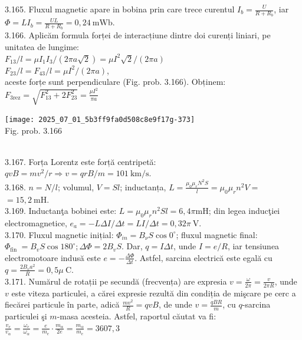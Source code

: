 \begin{center}
3.165. Fluxul magnetic apare in bobina prin care trece curentul $I_{b}=\frac{U}{R+R_{b}}$, iar $\Phi=L I_{b}=\frac{U L}{R+R_{b}}=0,24 \mathrm{~mWb}$.\\

3.166. Aplicăm formula forței de interacțiune dintre doi curenți liniari, pe unitatea de lungime:\\ $F_{13} / l=\mu I_{1} I_{3} /(2 \pi a \sqrt{2})=\mu I^{2} \sqrt{2} /(2 \pi a)$\\$F_{23} / l=F_{43} / l=\mu I^{2} /(2 \pi a)$,\\ aceste forțe sunt perpendiculare (Fig. prob. 3.166). Obținem: $F_{3 \mathrm{rez}}=\sqrt{F_{13}^{2}+2 F_{23}^{2}}=\frac{\mu I^{2}}{\pi a}$\\ \begin{center} \texttt{[image: 2025\_07\_01\_5b3ff9fa0d508c8e9f17g-373]}\\ Fig. prob. 3.166 \end{center}\\

3.167. Forța Lorentz este forță centripetă:\\ $q v B=m v^{2} / r \Rightarrow v=q r B / m=101 \mathrm{~km} / \mathrm{s}$.\\

3.168. $n=N / l$; volumul, $V=S l$; inductanța, $L=\frac{\mu_{0} \mu_{r} N^{2} S}{l}=\mu_{0} \mu_{r} n^{2} V=$ $=15,2 \mathrm{~mH}$.\\

3.169. Inductanţa bobinei este: $L=\mu_{0} \mu_{r} n^{2} S l=6,4 \pi \mathrm{mH}$; din legea inducţiei electromagnetice, $e_{a}=-L \Delta I / \Delta t=L I / \Delta t=0,32 \pi \mathrm{~V}$.\\

3.170. Fluxul magnetic inițial: $\Phi_{i n}=B_{\nu} S \cos 0^{\circ}$; fluxul magnetic final: $\Phi_{\text {fin }}=B_{v} S \cos 180^{\circ} ; \Delta \Phi=2 B_{v} S$. Dar, $q=I \Delta t$, unde $I=e / R$, iar tensiunea electromotoare indusă este $e=-\frac{\Delta \Phi}{\Delta t}$. Astfel, sarcina electrică este egală cu $q=\frac{2 B_{v} a^{2}}{R}=0,5 \mu \mathrm{~C}$.\\

3.171. Numărul de rotații pe secundă (frecvența) are expresia $v=\frac{\omega}{2 \pi}=\frac{v}{2 \pi R}$, unde $v$ este viteza particulei, a cărei expresie rezultă din condiția de mişcare pe cerc a fiecărei particule în parte, adică $\frac{m v^{2}}{R}=q v B$, de unde $v=\frac{q B R}{m}$, cu $q$-sarcina particulei şi $m$-masa acesteia. Astfel, raportul căutat va fi:\\ $\frac{v_{e}}{v_{\alpha}}=\frac{\omega_{e}}{\omega_{\alpha}}=\frac{e}{m_{e}} \cdot \frac{m_{\alpha}}{2 e}=\frac{m_{\alpha}}{m_{e}}=3607,3$\\


\end{center}
